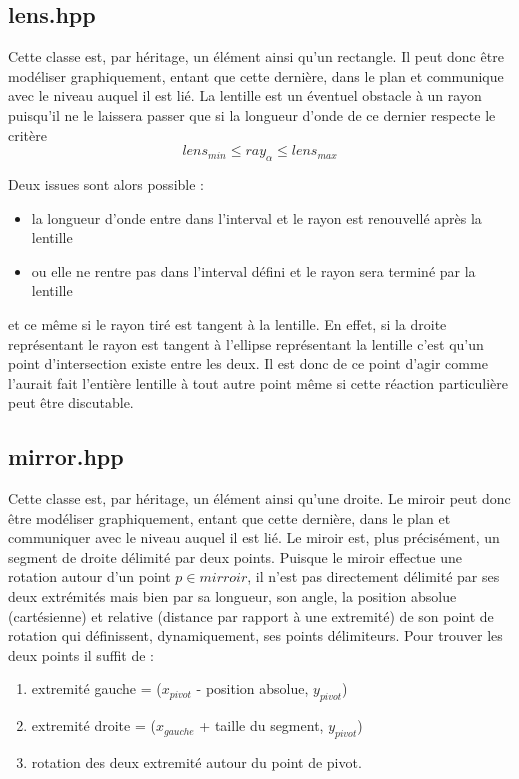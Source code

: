 \documentclass[a4paper,11pt]{report}
\begin{document}
\subsection[Lentille]{lens.hpp}
\begin{center}
\end{center}
Cette classe est, par héritage, un élément ainsi qu'un rectangle. Il peut donc
être modéliser graphiquement, entant que cette dernière, dans le plan et
communique avec le niveau auquel il est lié. La lentille est un éventuel
obstacle à un rayon puisqu'il ne le laissera passer que si la longueur d'onde de
ce dernier respecte le critère
$$lens_{min} \leq ray_{\alpha} \leq lens_{max}$$

Deux issues sont alors possible :
\begin{itemize}
	\item la longueur d'onde entre dans l'interval et le rayon est renouvellé
		après la lentille
	\item ou elle ne rentre pas dans l'interval défini et le rayon sera terminé par
		la lentille
\end{itemize}
et ce même si le rayon tiré est tangent à la lentille. En effet, si la droite
représentant le rayon est tangent à l'ellipse représentant la lentille c'est
qu'un point d'intersection existe entre les deux. Il est donc de ce point d'agir
comme l'aurait fait l'entière lentille à tout autre point même si cette
réaction particulière peut être discutable. 

\subsection[Miroir]{mirror.hpp}
Cette classe est, par héritage, un élément ainsi qu'une droite. Le miroir peut donc
être modéliser graphiquement, entant que cette dernière, dans le plan et
communiquer avec le niveau auquel il est lié. Le miroir est, plus précisément,
un segment de droite délimité par deux points. Puisque le miroir effectue une
rotation autour d'un point $p \in mirroir$, il n'est pas directement
délimité par ses deux extrémités mais bien par sa longueur, son angle, la position
absolue (cartésienne) et relative (distance par rapport à une extremité)
de son point de rotation qui définissent, dynamiquement, ses points délimiteurs.
Pour trouver les deux points il suffit de :
\begin{enumerate}
	\item extremité gauche = ($x_{pivot}$ - position absolue, $y_{pivot}$)
	\item extremité droite = ($x_{gauche}$ + taille du segment, $y_{pivot}$)
	\item rotation des deux extremité autour du point de pivot.
\end{enumerate}
\end{document}
